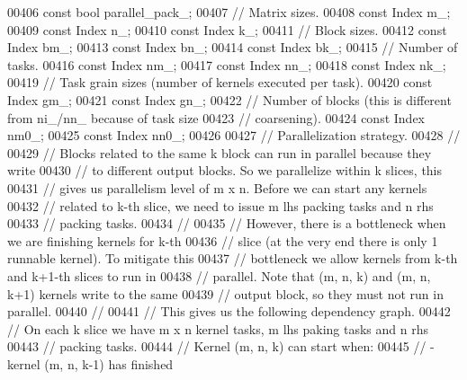 \begin{DoxyCode}
00406     \textcolor{keyword}{const} \textcolor{keywordtype}{bool} parallel\_pack\_;
00407     \textcolor{comment}{// Matrix sizes.}
00408     \textcolor{keyword}{const} Index m\_;
00409     \textcolor{keyword}{const} Index n\_;
00410     \textcolor{keyword}{const} Index k\_;
00411     \textcolor{comment}{// Block sizes.}
00412     \textcolor{keyword}{const} Index bm\_;
00413     \textcolor{keyword}{const} Index bn\_;
00414     \textcolor{keyword}{const} Index bk\_;
00415     \textcolor{comment}{// Number of tasks.}
00416     \textcolor{keyword}{const} Index nm\_;
00417     \textcolor{keyword}{const} Index nn\_;
00418     \textcolor{keyword}{const} Index nk\_;
00419     \textcolor{comment}{// Task grain sizes (number of kernels executed per task).}
00420     \textcolor{keyword}{const} Index gm\_;
00421     \textcolor{keyword}{const} Index gn\_;
00422     \textcolor{comment}{// Number of blocks (this is different from ni\_/nn\_ because of task size}
00423     \textcolor{comment}{// coarsening).}
00424     \textcolor{keyword}{const} Index nm0\_;
00425     \textcolor{keyword}{const} Index nn0\_;
00426 
00427     \textcolor{comment}{// Parallelization strategy.}
00428     \textcolor{comment}{//}
00429     \textcolor{comment}{// Blocks related to the same k block can run in parallel because they write}
00430     \textcolor{comment}{// to different output blocks. So we parallelize within k slices, this}
00431     \textcolor{comment}{// gives us parallelism level of m x n. Before we can start any kernels}
00432     \textcolor{comment}{// related to k-th slice, we need to issue m lhs packing tasks and n rhs}
00433     \textcolor{comment}{// packing tasks.}
00434     \textcolor{comment}{//}
00435     \textcolor{comment}{// However, there is a bottleneck when we are finishing kernels for k-th}
00436     \textcolor{comment}{// slice (at the very end there is only 1 runnable kernel). To mitigate this}
00437     \textcolor{comment}{// bottleneck we allow kernels from k-th and k+1-th slices to run in}
00438     \textcolor{comment}{// parallel. Note that (m, n, k) and (m, n, k+1) kernels write to the same}
00439     \textcolor{comment}{// output block, so they must not run in parallel.}
00440     \textcolor{comment}{//}
00441     \textcolor{comment}{// This gives us the following dependency graph.}
00442     \textcolor{comment}{// On each k slice we have m x n kernel tasks, m lhs paking tasks and n rhs}
00443     \textcolor{comment}{// packing tasks.}
00444     \textcolor{comment}{// Kernel (m, n, k) can start when:}
00445     \textcolor{comment}{//  - kernel (m, n, k-1) has finished}

\end{DoxyCode}
